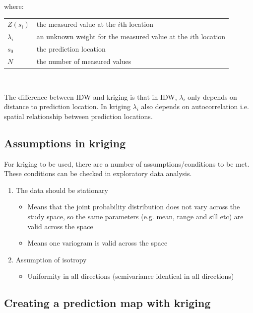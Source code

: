 \documentclass{article}
\makeatletter
\newenvironment{conditions}[1][where:] 
  {#1 \begin{tabular}[t]{>{$}l<{$} @{${}={}$} l}}
  {\end{tabular}\\[\belowdisplayskip]}
\makeatother
\begin{document}
\begin{conditions}
Z \left(s_{i}\right) & the measured value at the $i$th location \\
\lambda_{i} & an unknown weight for the measured value at the $i$th location \\
s_{0} & the prediction location \\
N & the number of measured values
\end{conditions}

The difference between IDW and kriging is that in IDW, $\lambda_{i}$ only depends on distance to prediction location.
In kriging $\lambda_{i}$ also depends on autocorrelation i.e. spatial relationship between prediction locations.

\subsection{Assumptions in kriging}

\begin{center}
\end{center}

For kriging to be used, there are a number of assumptions/conditions to be met.
These conditions can be checked in exploratory data analysis.

\begin{enumerate}
    \item The data should be stationary
    \begin{itemize}
        \item Means that the joint probability distribution does not vary across the study space, so the same parameters (e.g. mean, range and sill etc) are valid across the space
        \item Means one variogram is valid across the space
    \end{itemize}
    \item Assumption of isotropy
    \begin{itemize}
        \item Uniformity in all directions (semivariance identical in all directions)
    \end{itemize}
\end{enumerate}



\subsection{Creating a prediction map with kriging}
\end{document}
